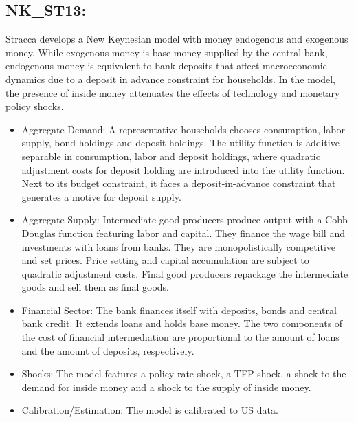 \documentclass[11pt,a4paper]{article}
\begin{document}
	\subsection{NK\_ST13: \texorpdfstring{\cite{stracca2013inside}}{Stracca (2013)}}
	\label{NKST13}
	Stracca develops a New Keynesian model with money endogenous and exogenous money. While exogenous money is base money supplied by the central bank, endogenous money is equivalent to bank deposits that affect macroeconomic dynamics due to a deposit in advance constraint for households. In the model, the presence of inside money attenuates the effects of technology and monetary policy shocks. 
	\begin{itemize}
		\item Aggregate Demand: A representative households chooses consumption, labor supply, bond holdings and deposit holdings. The utility function is additive separable in consumption, labor and deposit holdings, where quadratic adjustment costs for deposit holding are introduced into the utility function. Next to its budget constraint, it faces a deposit-in-advance constraint that generates a motive for deposit supply.
		
		\item Aggregate Supply: Intermediate good producers produce output with a Cobb-Douglas function featuring labor and capital. They finance the wage bill and investments with loans from banks. They are monopolistically competitive and set prices. Price setting and capital accumulation are subject to quadratic adjustment costs. Final good producers repackage the intermediate goods and sell them as final goods.
		
		\item Financial Sector: The bank finances itself with deposits, bonds and central bank credit. It extends loans and holds base money. The two components of the cost of financial intermediation are proportional to the amount of loans and the amount of deposits, respectively.
		
		\item Shocks: The model features a policy rate shock, a TFP shock, a shock to the demand for inside money and a shock to the supply of inside money.
		
		\item Calibration/Estimation: The model is calibrated to US data. 
	\end{itemize}
	
	
\end{document}
